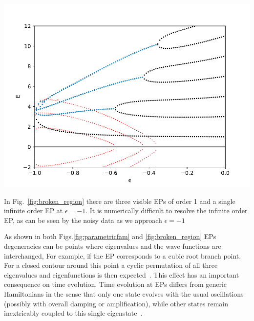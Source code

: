 \documentclass[12pt, a4paper]{report}
\newenvironment{Figure}
    {\par\medskip\noindent\minipage{\linewidth}}
    {\endminipage\par\medskip}
\begin{document}
\begin{Figure}
\centering
\includegraphics[width=0.6\linewidth]{broken_region.pdf}
\label{fig:broken_region}
\end{Figure}
In Fig.~\ref{fig:broken_region} there are three visible EPs of order 1 and a single infinite order EP at $\epsilon=-1$. 
It is numerically difficult to resolve the infinite order EP, as can be seen by the noisy data as we approach $\epsilon=-1$

As shown in both Figs.\ref{fig:parametricfam} and \ref{fig:broken_region} EPs degeneracies can be points where eigenvalues and the wave functions are interchanged, For example, if the EP corresponds to a cubic root branch point. For a closed contour around this point a cyclic permutation of all three eigenvalues and eigenfunctions is then expected~\cite{Cartarius}. This effect has an important consequence on time evolution. Time evolution at EPs differs from generic Hamiltonians in the sense that only one state evolves with the usual oscillations (possibly with overall damping or amplification), while other states remain inextricably coupled to this single eigenstate~\cite{Bossart}. 
\end{document}
